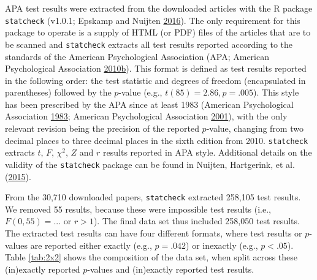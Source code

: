 \documentclass[a5paper]{book}
\begin{document}
APA test results were extracted from the downloaded articles with the R
package \texttt{statcheck} (v1.0.1; Epskamp and Nuijten
\protect\hyperlink{ref-statcheck}{2016}). The only requirement for this
package to operate is a supply of HTML (or PDF) files of the articles
that are to be scanned and \texttt{statcheck} extracts all test results
reported according to the standards of the American Psychological
Association (APA; American Psychological Association
\protect\hyperlink{ref-isbn:9781433805615}{2010}\protect\hyperlink{ref-isbn:9781433805615}{b}).
This format is defined as test results reported in the following order:
the test statistic and degrees of freedom (encapsulated in parentheses)
followed by the \(p\)-value (e.g., \(t(85)=2.86,p=.005\)). This style
has been prescribed by the APA since at least 1983 (American
Psychological Association
\protect\hyperlink{ref-American_Psychological_Association1983-yf}{1983};
American Psychological Association
\protect\hyperlink{ref-American_Psychological_Association2001-uw}{2001}),
with the only relevant revision being the precision of the reported
\(p\)-value, changing from two decimal places to three decimal places in
the sixth edition from 2010. \texttt{statcheck} extracts \(t\), \(F\),
\(\chi^{2}\), \(Z\) and \(r\) results reported in APA style. Additional
details on the validity of the \texttt{statcheck} package can be found
in Nuijten, Hartgerink, et al.
(\protect\hyperlink{ref-doi:10.3758ux2fs13428-015-0664-2}{2015}).

From the 30,710 downloaded papers, \texttt{statcheck} extracted 258,105
test results. We removed 55 results, because these were impossible test
results (i.e., \(F(0,55)=...\) or \(r>1\)). The final data set thus
included 258,050 test results. The extracted test results can have four
different formats, where test results or \(p\)-values are reported
either exactly (e.g., \(p=.042\)) or inexactly (e.g., \(p<.05\)). Table
\ref{tab:2x2} shows the composition of the data set, when split across
these (in)exactly reported \(p\)-values and (in)exactly reported test
results.

\begin{table}[!h]

\caption{\label{tab:2x2}Composition of extracted APA test results with respect to exact and inexact reporting of $p$-values or test statistics.}
\centering
{}
\end{table}
\end{document}
